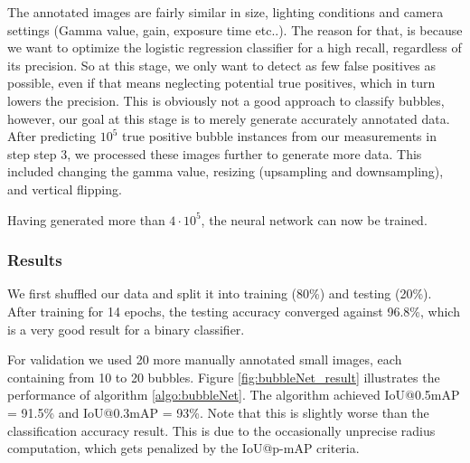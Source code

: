 			The annotated images are fairly similar in size, lighting conditions and camera settings (Gamma value, gain, exposure time etc..). The reason for that, is because we want to optimize the logistic regression classifier for a high recall, regardless of its precision. So at this stage, we only want to detect as few false positives as possible, even if that means neglecting potential true positives, which in turn lowers the precision. This is obviously not a good approach to classify bubbles, however, our goal at this stage is to merely generate accurately annotated data. After predicting $10^5$ true positive bubble instances from our measurements in step step 3, we processed these images further to generate more data. This included changing the gamma value, resizing (upsampling and downsampling), and vertical flipping. 
			
			Having generated more than $4 \cdot 10^5$, the neural network can now be trained. 
			
			
			
			


			
		\subsubsection{Results}
			
			We first shuffled our data and split it into training (80\%) and testing (20\%). After training for 14 epochs, the testing accuracy converged against 96.8\%, which is a very good result for a binary classifier. 
			
			For validation we used 20 more manually annotated small images, each containing from 10 to 20 bubbles. Figure \ref{fig:bubbleNet_result} illustrates the performance of algorithm \ref{algo:bubbleNet}.  
			The algorithm achieved IoU@0.5mAP = 91.5\% and IoU@0.3mAP = 93\%. Note that this is slightly worse than the classification accuracy result. This is due to the occasionally unprecise radius computation, which gets penalized by the IoU@p-mAP criteria. 
	
